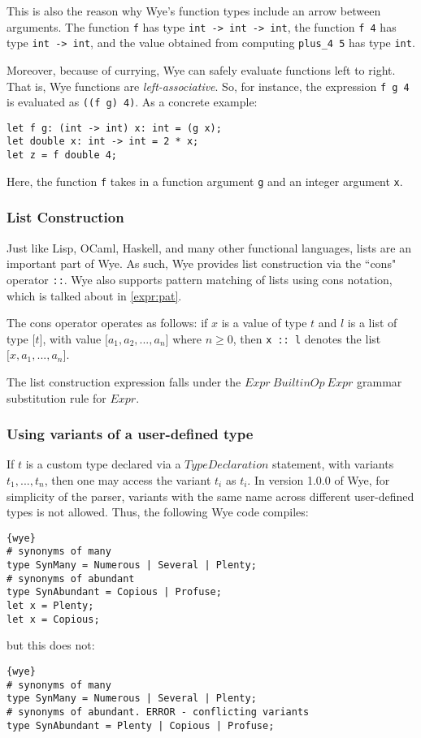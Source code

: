 \documentclass[a4paper, 12pt]{article}
\newcommand{\version}{1.0.0}
\begin{document}
This is also the reason why Wye's function types include an arrow between arguments. The function \texttt{f} has type \texttt{int -> int -> int}, the function \texttt{f 4} has type \texttt{int -> int}, and the value obtained from computing \texttt{plus\_4 5} has type \texttt{int}.

Moreover, because of currying, Wye can safely evaluate functions left to right. That is, Wye functions are \textit{left-associative}. So, for instance, the expression \texttt{f g 4} is evaluated as \texttt{((f g) 4)}. As a concrete example:
\begin{lstlisting}
let f g: (int -> int) x: int = (g x);
let double x: int -> int = 2 * x;
let z = f double 4;
\end{lstlisting}
Here, the function \texttt{f} takes in a function argument \texttt{g} and an integer argument \texttt{x}. 

\subsubsection{List Construction}\label{expr:cons}
Just like Lisp, OCaml, Haskell, and many other functional languages, lists are an important part of Wye. As such, Wye provides list construction via the ``cons" operator \texttt{::}. Wye also supports pattern matching of lists using cons notation, which is talked about in \ref{expr:pat}.

The cons operator operates as follows: if $x$ is a value of type $t$ and $l$ is a list of type $\texttt{[}t\texttt{]}$, with value $\texttt{[}a_1, a_2, ..., a_n\texttt{]}$ where $n\geq 0$, then \texttt{x :: l} denotes the list $\texttt{[}x, a_1, ..., a_n\texttt{]}$.

The list construction expression falls under the $Expr\: BuiltinOp\: Expr$ grammar substitution rule for $Expr$.

\subsubsection{Using variants of a user-defined type}
If $t$ is a custom type declared via a $TypeDeclaration$ statement, with variants $t_1, ..., t_n$, then one may access the variant $t_i$ as $t_i$. In version \version{} of Wye, for simplicity of the parser, variants with the same name across different user-defined types is not allowed. Thus, the following Wye code compiles:
\begin{lstlisting}{wye}
# synonyms of many
type SynMany = Numerous | Several | Plenty;
# synonyms of abundant
type SynAbundant = Copious | Profuse;
let x = Plenty;
let x = Copious;
\end{lstlisting}
but this does not:
\begin{lstlisting}{wye}
# synonyms of many
type SynMany = Numerous | Several | Plenty;
# synonyms of abundant. ERROR - conflicting variants
type SynAbundant = Plenty | Copious | Profuse;
\end{lstlisting}
\end{document}
